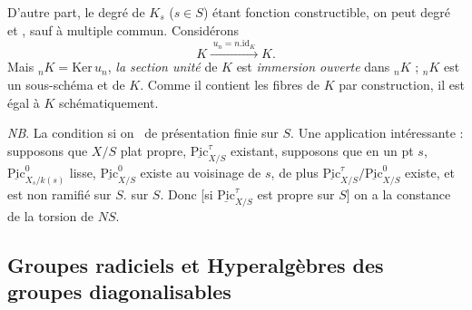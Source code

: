 \documentclass[11pt,a4paper]{article}
\begin{document}


D'autre part, le degré de $K_s$ ($s \in S$) étant fonction constructible,
on peut   degré  et
, sauf à \ill{}  multiple commun.
Considérons
\[
K \xrightarrow{\;u_n = n.\mathrm{id}_K\;} K .
\]
Mais ${}_nK = \mathrm{Ker}\, u_n$,  \emph{la section unité}
de $K$ est  \emph{immersion ouverte} dans ${}_nK$ ;
${}_nK$ est un sous-schéma  et  de $K$.
Comme il contient les fibres de $K$ par construction, il est égal à $K$
 \ill{} \ill{} schématiquement.

\emph{NB}. La condition   \ill{} si on
\ill{} \ill{} \ de  présentation finie sur $S$. Une application
intéressante : supposons que $X/S$ plat propre,
\struck{\ill{}} $\underline{\mathrm{Pic}}^{\tau}_{X/S}$ \struck{\ill{}}
existant, supposons que en un pt $s$,
$\underline{\mathrm{Pic}}^{0}_{X_s/k(s)}$  \add{\ill{}}
lisse,  $\underline{\mathrm{Pic}}^{0}_{X/S}$ existe au
voisinage de $s$, de plus
$\underline{\mathrm{Pic}}^{\tau}_{X/S}/\underline{\mathrm{Pic}}^{0}_{X/S}$
existe, et est non ramifié sur $S$. \ill{} \ill{} \ill{}
 sur $S$. Donc [si $\underline{\mathrm{Pic}}^{\tau}_{X/S}$
est propre sur $S$] on a la constance de la torsion de $NS$.

\subsection*{Groupes radiciels et Hyperalgèbres des groupes diagonalisables}

\end{document}
